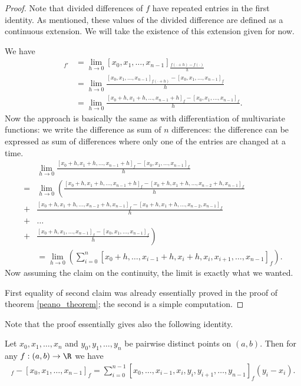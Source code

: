 \begin{proof}
	Note that divided differences of $f$ have repeated entries in the first identity. As mentioned, these values of the divided difference are defined as a continuous extension. We will take the existence of this extension given for now.

	We have
	\begin{align*}
		[x_{0}, x_{1}, \ldots, x_{n - 1}]_{f'} &= \lim_{h \to 0} [x_{0}, x_{1}, \ldots, x_{n - 1}]_{\frac{f(\cdot + h) - f(\cdot)}{h}} \\
		&= \lim_{h \to 0} \frac{[x_{0}, x_{1}, \ldots, x_{n - 1}]_{f(\cdot + h)} -[x_{0}, x_{1}, \ldots, x_{n - 1}]_{f}}{h} \\
		&= \lim_{h \to 0} \frac{[x_{0} + h, x_{1} + h, \ldots, x_{n - 1} + h]_{f} -[x_{0}, x_{1}, \ldots, x_{n - 1}]_{f}}{h}.
	\end{align*}
	Now the approach is basically the same as with differentiation of multivariate functions: we write the difference as sum of $n$ differences: the difference can be expressed as sum of differences where only one of the entries are changed at a time.
	\begin{align*}
		& \lim_{h \to 0} \frac{[x_{0} + h, x_{1} + h, \ldots, x_{n - 1} + h]_{f} -[x_{0}, x_{1}, \ldots, x_{n - 1}]_{f}}{h} \\
		=& \lim_{h \to 0} \left(\frac{[x_{0} + h, x_{1} + h, \ldots, x_{n - 1} + h]_{f} - [x_{0} + h, x_{1} + h, \ldots, x_{n - 2} + h,  x_{n - 1}]_{f}}{h} \right. \\
		+& \frac{[x_{0} + h, x_{1} + h, \ldots, x_{n - 2} + h, x_{n - 1}]_{f} - [x_{0} + h, x_{1} + h, \ldots, x_{n - 2}, x_{n - 1}]_{f}}{h} \\
		+& \ldots \\
		+& \left. \frac{[x_{0} + h, x_{1}, \ldots, x_{n - 1}]_{f} - [x_{0}, x_{1}, \ldots, x_{n - 1}]_{f}}{h} \right)\\
		&= \lim_{h \to 0} \left(\sum_{i = 0}^{n} [x_{0} + h, \ldots, x_{i - 1} + h, x_{i} + h, x_{i}, x_{i + 1}, \ldots, x_{n - 1}]_{f} \right).
	\end{align*}
	Now assuming the claim on the continuity, the limit is exactly what we wanted.

	First equality of second claim was already essentially proved in the proof of theorem \ref{peano_theorem}; the second is a simple computation.
\end{proof}

Note that the proof essentially gives also the following identity.
\begin{prop}\label{total_derivative}
	Let $x_{0}, x_{1}, \ldots, x_{n}$ and $y_{0}, y_{1}, \ldots, y_{n}$ be pairwise distinct points on $(a, b)$. Then for any $f : (a, b) \to \R$ we have
	\begin{align}
		[y_{0}, y_{1}, \ldots, y_{n - 1}]_{f} - [x_{0}, x_{1}, \ldots, x_{n - 1}]_{f} = \sum_{i = 0}^{n - 1} [x_{0}, \ldots, x_{i - 1}, x_{i}, y_{i}, y_{i + 1}, \ldots, y_{n - 1}]_{f} (y_{i} - x_{i}).
	\end{align}
\end{prop}

